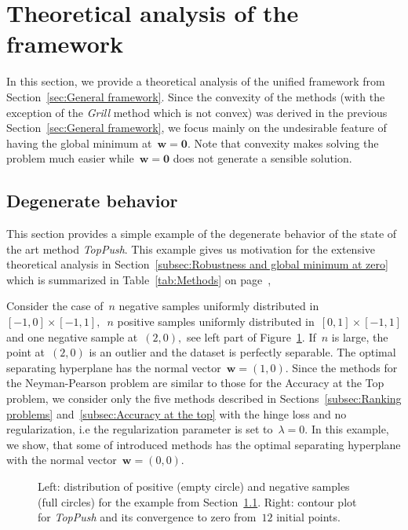 \documentclass[11pt,a4paper]{article}
\theoremstyle{definition}
\newcommand{\toppush}{\textit{TopPush}\xspace}
\newcommand{\grill}{\textit{Grill}\xspace}
\begin{document}
\section{Theoretical analysis of the framework}


In this section, we provide a theoretical analysis of the unified framework from Section~\ref{sec:General framework}. Since the convexity of the methods (with the exception of the \grill method which is not convex) was derived in the previous Section~\ref{sec:General framework}, we focus mainly on the undesirable feature of having the global minimum at~$\bm{w} = \bm{0}.$ Note that convexity makes solving the problem much easier while~$\bm{w} = \bm{0}$ does not generate a sensible solution.


\subsection{Degenerate behavior}\label{subsec:Degenerate behavior} 

This section provides a simple example of the degenerate behavior of the state of the art method \toppush. This example gives us motivation for the extensive theoretical analysis in Section~\ref{subsec:Robustness and global minimum at zero} which is summarized in Table~\ref{tab:Methods} on page~\pageref{tab:Methods}, 

Consider the case of~$n$ negative samples uniformly distributed in~$[-1,0]\times[-1,1],$~$n$ positive samples uniformly distributed in~$[0,1]\times[-1,1]$ and one negative sample at~$(2,0),$ see left part of Figure~\ref{fig:example}. If~$n$ is large, the point at~$(2,0)$ is an outlier and the dataset is perfectly separable. The optimal separating hyperplane has the normal vector~$\bm{w} = (1,0).$ Since the methods for the Neyman-Pearson problem are similar to those for the Accuracy at the Top problem, we consider only the five methods described in Sections~\ref{subsec:Ranking problems} and~\ref{subsec:Accuracy at the top} with the hinge loss and no regularization, i.e the regularization parameter is set to~$\lambda = 0.$ In this example, we show, that some of introduced methods has the optimal separating hyperplane with the normal vector~$\bm{w} = (0,0).$

\begin{figure}[!ht]
  \centering
  
  \caption{Left: distribution of positive (empty circle) and negative samples (full circles) for the example from Section~\ref{subsec:Degenerate behavior}. Right: contour plot for \toppush and its convergence to zero from~$12$ initial points.}
  \label{fig:example}
\end{figure}
\end{document}
